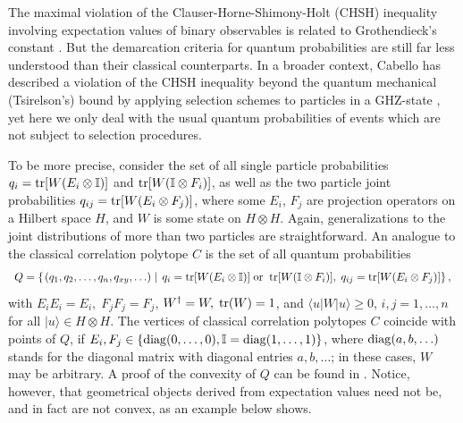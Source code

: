 
The maximal violation of the
Clauser-Horne-Shimony-Holt (CHSH) inequality involving expectation values of
binary observables is related to Grothendieck's constant
\cite{fishburn-reeds-1994}. But the demarcation criteria for quantum
probabilities are still far less understood than their classical
counterparts.
In a broader context, Cabello has described a
violation of the CHSH inequality beyond the quantum mechanical (Tsirelson's)
bound by applying selection schemes to particles in a GHZ-state
\cite{cabello-02a,cabello-02b}, yet here we only deal with the usual quantum probabilities of events
which are not subject to selection procedures.


To be more precise,
consider the set of all  single particle
probabilities
$q_{i}={\rm tr}[W(E_{i}\otimes {\Bbb I})]$
and
${\rm tr}[W({\Bbb I}\otimes F_{i})]$,
as well as the two particle joint probabilities
$q_{ij}={\rm tr}[W(E_{i}\otimes F_{j})]$, where some $E_{i}$,
$F_{j}$ are projection operators on a Hilbert space $H$,
and $W$ is some state on $H\otimes H$.
Again, generalizations to the joint distributions of more than two particles are straightforward.
An analogue to the classical correlation polytope  $C$
is the set of all quantum probabilities
\begin{equation}
\label{e-2003-qpoly-Q}
\begin{array}{l}
Q
= \left\{
\left.
\large(q_1, q_2,\ldots , q_n, q_{xy},\ldots \large)
\; \right| \;
q_{i}={\rm tr}[W(E_{i}\otimes {\Bbb I})]\;{\rm or}\;\;{\rm tr}[W({\Bbb I}\otimes F_{i})],\; q_{ij}={\rm tr}[W(E_{i}\otimes F_{j})]
\right\},
\end{array}\nonumber
\end{equation}
with $E_{i}E_{i}=E_{i},\; F_{j}F_{j}=F_{j}$,
$W^\dagger =W,\; {\rm tr} (W)=1$,
and
$\langle u | W | u \rangle \ge 0$,
$i,j=1,\ldots ,n$ for all $\vert u\rangle \in H\otimes H$.
The vertices of classical correlation polytopes $C$
coincide with points of $Q$,
if $E_i,F_j\in \{{\rm diag}(0,\ldots ,0),{\Bbb I}={\rm diag}(1,\ldots ,1)\}$, where
${\rm diag}(a,b,\ldots )$ stands for the diagonal matrix
with diagonal entries $a,b,\ldots $;
in these cases, $W$ may be arbitrary.
A proof of the convexity of $Q$ can be found in  \cite{pit:range-2001}.
Notice, however, that geometrical objects derived from expectation values
need not be, and in fact are not convex, as an example below shows.

